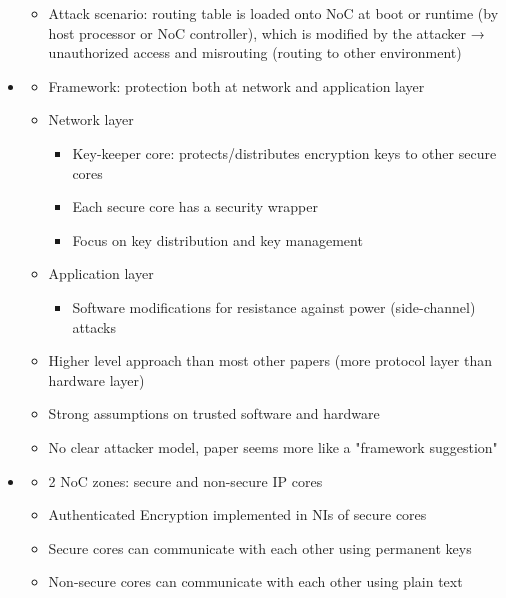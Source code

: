 \begin{itemize}
\begin{itemize}
            \item Attack scenario: routing table is loaded onto NoC at boot or runtime (by host processor or NoC controller), which is modified by
                the attacker → unauthorized access and misrouting (routing to other environment)
        \end{itemize}
    \item \textbf{} \checkmark
        \begin{itemize}
            \item Framework: protection both at network and application layer
            \item Network layer
                \begin{itemize}
                    \item Key-keeper core: protects/distributes encryption keys to other secure cores
                    \item Each secure core has a security wrapper
                    \item Focus on key distribution and key management
                \end{itemize}
            \item Application layer
                \begin{itemize}
                    \item Software modifications for resistance against power (side-channel) attacks
                \end{itemize}
            \item Higher level approach than most other papers (more protocol layer than hardware layer)
            \item Strong assumptions on trusted software and hardware
            \item No clear attacker model, paper seems more like a "framework suggestion"
        \end{itemize}
    \item \textbf{} \checkmark
        \begin{itemize}
            \item 2 NoC zones: secure and non-secure IP cores
            \item Authenticated Encryption implemented in NIs of secure cores
            \item Secure cores can communicate with each other using permanent keys
            \item Non-secure cores can communicate with each other using plain text

\end{itemize}
\end{itemize}
